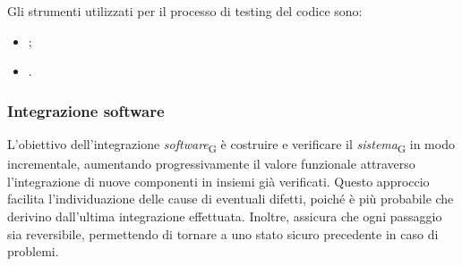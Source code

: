 Gli strumenti utilizzati per il processo di testing del codice sono:
\begin{itemize}
    \item {};
    \item {}.
\end{itemize}

\subsubsection{Integrazione software}
L'obiettivo dell'integrazione \textit{software}\textsubscript{G} è costruire e verificare il \textit{sistema}\textsubscript{G} in modo incrementale, aumentando progressivamente il valore funzionale attraverso l'integrazione di nuove componenti in insiemi già verificati. Questo approccio facilita l'individuazione delle cause di eventuali difetti, poiché è più probabile che derivino dall'ultima integrazione effettuata. Inoltre, assicura che ogni passaggio sia reversibile, permettendo di tornare a uno stato sicuro precedente in caso di problemi.

